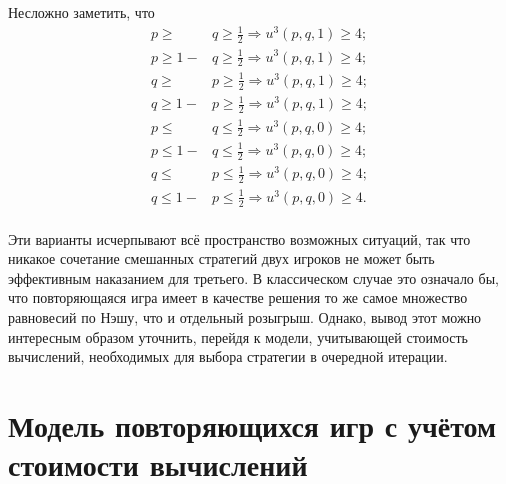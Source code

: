 Несложно заметить, что
\begin{align*}
	p \ge &q \ge \frac{1}{2} \Rightarrow u^3(p, q, 1) \ge 4; \\
	p \ge 1 - &q \ge \frac{1}{2} \Rightarrow u^3(p, q, 1) \ge 4; \\
	q \ge &p \ge \frac{1}{2} \Rightarrow u^3(p, q, 1) \ge 4; \\
	q \ge 1 - &p \ge \frac{1}{2} \Rightarrow u^3(p, q, 1) \ge 4; \\
	p \le &q \le \frac{1}{2} \Rightarrow u^3(p, q, 0) \ge 4; \\
	p \le 1 - &q \le \frac{1}{2} \Rightarrow u^3(p, q, 0) \ge 4; \\
	q \le &p \le \frac{1}{2} \Rightarrow u^3(p, q, 0) \ge 4; \\
	q \le 1 - &p \le \frac{1}{2} \Rightarrow u^3(p, q, 0) \ge 4. \\
\end{align*}

Эти варианты исчерпывают всё пространство возможных ситуаций, так что никакое сочетание смешанных стратегий двух игроков не может быть эффективным наказанием для третьего. В классическом случае это означало бы, что повторяющаяся игра имеет в качестве решения то же самое множество равновесий по Нэшу, что и отдельный розыгрыш. Однако, вывод этот можно интересным образом уточнить, перейдя к модели, учитывающей стоимость вычислений, необходимых для выбора стратегии в очередной итерации.

\section{Модель повторяющихся игр с учётом стоимости вычислений}\label{sec:ch3/sect2}

